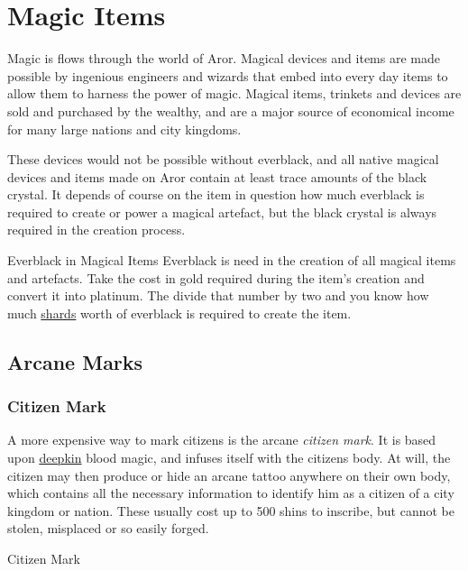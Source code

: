 \section{Magic Items}

Magic is flows through the world of Aror. Magical devices and items
are made possible by ingenious engineers and wizards that embed
 into every day items to allow them to harness
the power of magic. Magical items, trinkets and devices are sold and
purchased by the wealthy, and are a major source of economical income
for many large nations and city kingdoms.

These devices would not be possible without everblack, and all native
magical devices and items made on Aror contain at least trace amounts
of the black crystal. It depends of course on the item in question how
much everblack is required to create or power a magical artefact, but
the black crystal is always required in the creation process.

\begin{35e}{Everblack in Magical Items}
  Everblack is need in the creation of all magical items and artefacts.
  Take the cost in gold required during the item's creation and convert
  it into platinum. The divide that number by two and you know how much
  \hyperref[sec:Shard]{shards} worth of everblack is required to create the
  item.
\end{35e}

\subsection{Arcane Marks}

\subsubsection{Citizen Mark}
\label{sec:Citizen Mark}

A more expensive way to mark citizens is the arcane \emph{citizen mark}. It is
based upon \hyperref[sec:Deepkin]{deepkin} blood magic, and infuses itself
with the citizens body. At will, the citizen may then produce or hide an
arcane tattoo anywhere on their own body, which contains all the necessary
information to identify him as a citizen of a city kingdom or nation. These
usually cost up to 500 shins to inscribe, but cannot be stolen, misplaced or
so easily forged.

\begin{35e}{Citizen Mark}
\end{35e}

